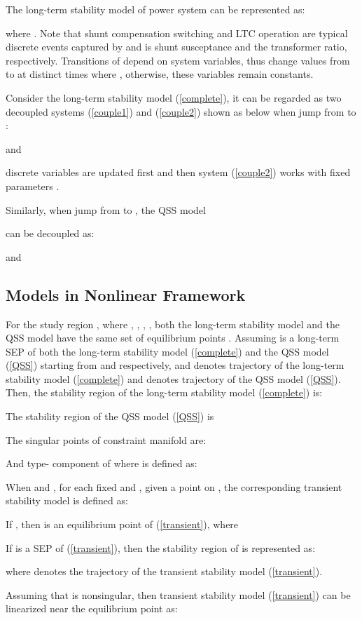 \documentclass[journal]{IEEEtran}
\begin{document}
The long-term stability model of power system can be represented as:


where . Note that shunt compensation switching and LTC operation are typical discrete events captured by  and  is shunt susceptance and the transformer ratio, respectively. Transitions of  depend on system variables, thus  change values from  to  at distinct times  where , otherwise, these variables remain constants.

Consider the long-term stability model (\ref{complete}), it can be regarded as two decoupled systems (\ref{couple1}) and (\ref{couple2}) shown as below when  jump from  to :

and

discrete variables  are updated first and then system (\ref{couple2}) works with fixed parameters .

Similarly, when  jump from  to , the QSS model

can be decoupled as:

and

\subsection{Models in Nonlinear Framework}
For the study region , where , , , , both the long-term stability model and the QSS model have the same set of equilibrium points . Assuming  is a long-term SEP of both the long-term stability model (\ref{complete}) and the QSS model (\ref{QSS}) starting from  and  respectively, and  denotes trajectory of the long-term stability model (\ref{complete}) and  denotes trajectory of the QSS model (\ref{QSS}). Then, the stability region of the long-term stability model (\ref{complete}) is:


The stability region of the QSS model (\ref{QSS}) is


The singular points of constraint manifold  are:

And type- component of  where  is defined as:


When  and , for each fixed  and , given a point  on , the corresponding transient stability model is defined as:

If , then
 is an equilibrium point of (\ref{transient}), where

If  is a SEP of (\ref{transient}), then the stability region of  is represented as:

where  denotes the trajectory of the transient stability model (\ref{transient}).

Assuming that  is nonsingular, then transient stability model (\ref{transient}) can be linearized near the equilibrium point as:
\end{document}
